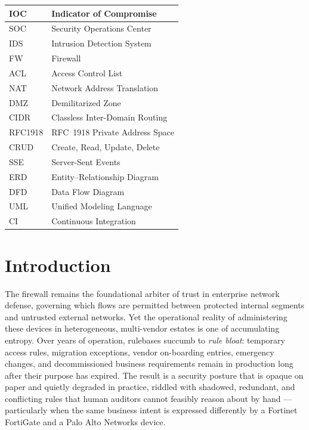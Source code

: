 \documentclass[12pt,a4paper]{report}
\renewcommand{\_}{\textunderscore\allowbreak}
\begin{document}
\begin{center}
\begin{longtable}{|L{2.8cm}|L{11.6cm}|}
IOC & Indicator of Compromise \\ \hline
SOC & Security Operations Center \\ \hline
IDS & Intrusion Detection System \\ \hline
FW & Firewall \\ \hline
ACL & Access Control List \\ \hline
NAT & Network Address Translation \\ \hline
DMZ & Demilitarized Zone \\ \hline
CIDR & Classless Inter-Domain Routing \\ \hline
RFC1918 & RFC~1918 Private Address Space \\ \hline
CRUD & Create, Read, Update, Delete \\ \hline
SSE & Server-Sent Events \\ \hline
ERD & Entity--Relationship Diagram \\ \hline
DFD & Data Flow Diagram \\ \hline
UML & Unified Modeling Language \\ \hline
CI & Continuous Integration \\ \hline

%
\end{longtable}
\end{center}
\clearpage

\cleardoublepage
{}
\pagestyle{fancy}

\chapter{Introduction}
\label{ch:introduction}

The firewall remains the foundational arbiter of trust in enterprise network defense, governing which flows are permitted between protected internal segments and untrusted external networks. Yet the operational reality of administering these devices in heterogeneous, multi-vendor estates is one of accumulating entropy. Over years of operation, rulebases succumb to \emph{rule bloat}: temporary access rules, migration exceptions, vendor on-boarding entries, emergency changes, and decommissioned business requirements remain in production long after their purpose has expired. The result is a security posture that is opaque on paper and quietly degraded in practice, riddled with shadowed, redundant, and conflicting rules that human auditors cannot feasibly reason about by hand --- particularly when the same business intent is expressed differently by a Fortinet FortiGate and a Palo Alto Networks device.
\end{document}
